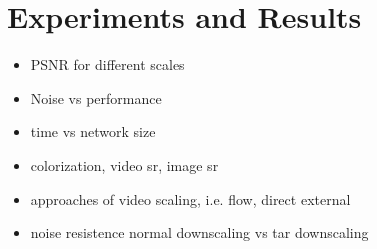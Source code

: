 \newpage
\section{Experiments and Results}
\label{sec:ExperimentsandResults}



\begin{itemize}
  \item PSNR for different scales
  \item Noise vs performance
  \item time vs network size
  \item colorization, video sr, image sr
  \item approaches of video scaling, i.e. flow, direct external
  \item noise resistence normal downscaling vs tar downscaling
\end{itemize}


